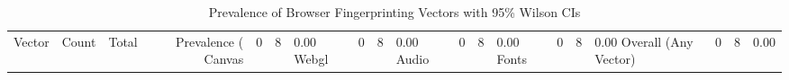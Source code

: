 \begin{table}[htbp]
\centering
\caption{Prevalence of Browser Fingerprinting Vectors with 95\% Wilson CIs}
\label{tab:prevalence_summary}
\begin{tabular}{lrrrrr}
\hline
Vector & Count & Total & Prevalence (%
\hline
Canvas & 0 & 8 & 0.00%
Webgl & 0 & 8 & 0.00%
Audio & 0 & 8 & 0.00%
Fonts & 0 & 8 & 0.00%
Overall (Any Vector) & 0 & 8 & 0.00%
\hline
\end{tabular}
\end{table}

